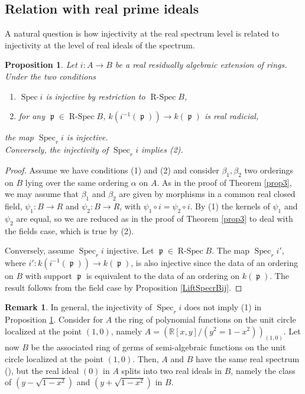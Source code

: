 \documentclass[12pt]{amsart}
\newtheorem{prop}[thm]{Proposition}
\theoremstyle{definition}
\newtheorem{rem}[thm]{Remark}
\DeclareMathOperator{\Sp}{Spec}
\DeclareMathOperator{\ReSp}{R-Spec}
\DeclareMathOperator{\p}{\mathfrak{p}}
\def \RR {{\mathbb R}}
\begin{document}
\subsection{Relation with real prime ideals}

A natural question is how injectivity at the real spectrum level is related to injectivity at the level of real ideals of the spectrum.



\begin{prop}
\label{prop3bis}
Let $i:A\to B$ be a real residually algebraic extension of rings. Under the two conditions
\begin{enumerate}
\item $\Sp i$ is injective by restriction to $\ReSp B$,
\item for any $\p\in \ReSp B$, $k(i^{-1}(\p))\to k(\p)$ is  real radicial,
\end{enumerate}
the map $\Sp_r i$ is injective.\\
Conversely, the injectivity of $\Sp_r i$ implies (2).
 \end{prop}

\begin{proof}
Assume we have conditions (1) and (2) and consider $\beta_1,\beta_2$ two orderings on $B$ lying over the same ordering $\alpha$ on $A$. As in the proof of Theorem \ref{prop3}, we may assume that $\beta_1$ and $\beta_2$ are given by morphisms in a common real closed field, $\psi_1:B\to R$ and $\psi_2:B\to R$, with $\psi_1 \circ i=\psi_2 \circ i$. By (1) the kernels of $\psi_1$ and $\psi_2$ are equal, so we are reduced as in the proof of Theorem \ref{prop3} to deal with the fields case, which is true by (2).

Conversely, assume $\Sp_r i$ injective. Let $\p\in\ReSp B$. The map $\Sp_{r} i'$,  where $i': k(i^{-1}(\p))\to k(\p)$, is also injective since the data of an ordering on $B$ with support $\p$ is equivalent to the data of an ordering on $k(\p)$. The result follows from the field case by Proposition \ref{LiftSpecrBij}.
\end{proof}


\begin{rem} \label{remprop3} In general, the injectivity of $\Sp_r i$ does not imply (1) in Proposition \ref{prop3bis}. 
Consider for $A$ the ring of polynomial functions on the unit circle localized at the point $(1,0)$, namely $A=(\RR[x,y]/(y^2=1-x^2))_{(1,0)}$. Let now $B$ be the associated ring of germs of semi-algebraic functions 
on the unit circle localized at the point $(1,0)$. Then, $A$ and $B$ have the same real spectrum (\cite[8.5.2]{BCR}), 
but the real ideal $(0)$ in $A$ splits into two real ideals in $B$, namely the class of $(y-\sqrt{1-x^2})$ and $(y+\sqrt{1-x^2})$ in $B$.
\end{rem}
\end{document}
